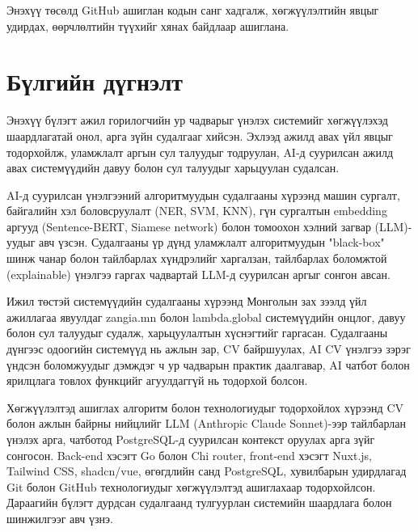 \par{}Энэхүү төсөлд GitHub ашиглан кодын санг хадгалж, хөгжүүлэлтийн явцыг удирдах, өөрчлөлтийн түүхийг хянах байдлаар ашиглана.


\section*{Бүлгийн дүгнэлт}
\par{}Энэхүү бүлэгт ажил горилогчийн ур чадварыг үнэлэх системийг хөгжүүлэхэд шаардлагатай онол, арга зүйн судалгааг хийсэн. Эхлээд ажилд авах үйл явцыг тодорхойлж, уламжлалт аргын сул талуудыг тодруулан, AI-д суурилсан ажилд авах системүүдийн давуу болон сул талуудыг харьцуулан судалсан.

\par{}AI-д суурилсан үнэлгээний алгоритмуудын судалгааны хүрээнд машин сургалт, байгалийн хэл боловсруулалт (NER, SVM, KNN), гүн сургалтын embedding аргууд (Sentence-BERT, Siamese network) болон томоохон хэлний загвар (LLM)-уудыг авч үзсэн. Судалгааны үр дүнд уламжлалт алгоритмуудын "black-box" шинж чанар болон тайлбарлах хүндрэлийг харгалзан, тайлбарлах боломжтой (explainable) үнэлгээ гаргах чадвартай LLM-д суурилсан аргыг сонгон авсан.

\par{}Ижил төстэй системүүдийн судалгааны хүрээнд Монголын зах зээлд үйл ажиллагаа явуулдаг zangia.mn болон lambda.global системүүдийн онцлог, давуу болон сул талуудыг судалж, харьцуулалтын хүснэгтийг гаргасан. Судалгааны дүнгээс одоогийн системүүд нь ажлын зар, CV байршуулах, AI CV үнэлгээ зэрэг үндсэн боломжуудыг дэмждэг ч ур чадварын практик даалгавар, AI чатбот болон ярилцлага товлох функцийг агуулдаггүй нь тодорхой болсон.

\par{}Хөгжүүлэлтэд ашиглах алгоритм болон технологиудыг тодорхойлох хүрээнд CV болон ажлын байрны нийцлийг LLM (Anthropic Claude Sonnet)-ээр тайлбарлан үнэлэх арга, чатботод PostgreSQL-д суурилсан контекст оруулах арга зүйг сонгосон. Back-end хэсэгт Go болон Chi router, front-end хэсэгт Nuxt.js, Tailwind CSS, shadcn/vue, өгөгдлийн санд PostgreSQL, хувилбарын удирдлагад Git болон GitHub технологиудыг хөгжүүлэлтэд ашиглахаар тодорхойлсон. Дараагийн бүлэгт дурдсан судалгаанд тулгуурлан системийн шаардлага болон шинжилгээг авч үзнэ.